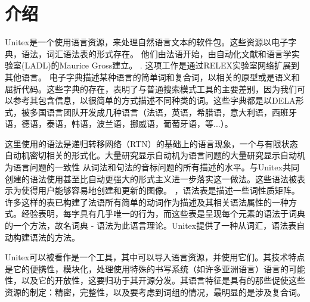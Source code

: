 \chapter*{介绍}

Unitex是一个使用语言资源，来处理自然语言文本的软件包。这些资源以电子字典，语法，词汇语法表的形式存在。  他们由法语开始，由自动化文献和语言学实验室(LADL)的Maurice Gross建立。 
.  这项工作是通过RELEX实验室网络扩展到其他语言。
\bigskip
\noindent 电子字典描述某种语言的简单词和复合词，以相关的原型或是语义和屈折代码。这些字典的存在，表明了与普通搜索模式工具的主要差别，因为我们可以参考其包含信息，以很简单的方式描述不同种类的词。这些字典都是以DELA形式，被多国语言团队开发成几种语言（法语，英语，希腊语，意大利语，西班牙语，德语，泰语，韩语，波兰语，挪威语，葡萄牙语，等...）。

\bigskip
\noindent 这里使用的语法是递归转移网络（RTN）的基础上的语言现象，一个与有限状态自动机密切相关的形式化。大量研究显示自动机为语言问题的大量研究显示自动机为语言问题的一致性
从词法和句法的音标问题的所有描述的水平。与Unitex共同创建的语法使用甚至比自动更强大的形式主义进一步落实这一做法。这些语法被表示为使得用户能够容易地创建和更新的图像。
\bigskip
{}，语法表是描述一些词性质矩阵。许多这样的表已构建了法语所有简单的动词作为描述及其相关语法属性的一种方式。经验表明，每字具有几乎唯一的行为，而这些表是呈现每个元素的语法于词典的一个方法，故名词典 - 语法为此语言理论。Unitex提供了一种从词汇，语法表自动构建语法的方法。 

\bigskip
\noindent Unitex可以被看作是一个工具，其中可以导入语言资源，并使用它们。其技术特点是它的便携性，模块化，处理使用特殊的书写系统（如许多亚洲语言）语言的可能性，以及它的开放性，这要归功于其开源分发。其语言特征是具有的那些促使这些资源的制定：精密，完整性，以及要考虑到词组的情况，最明显的是涉及复合词。




